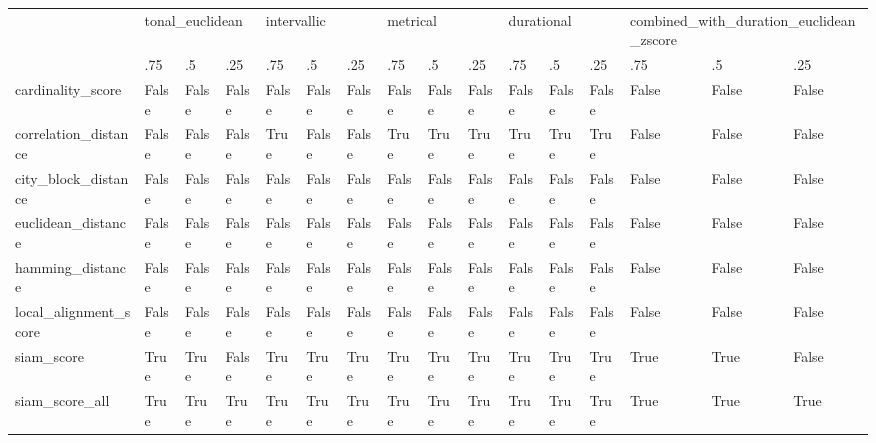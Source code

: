 \begin{tabular}{llllllllllllllll}
\toprule
{} & \multicolumn{3}{l}{tonal\_euclidean} & \multicolumn{3}{l}{intervallic} & \multicolumn{3}{l}{metrical} & \multicolumn{3}{l}{durational} & \multicolumn{3}{l}{combined\_with\_duration\_euclidean\_zscore} \\
{} & .75 & .5 & .25 & .75 & .5 & .25 & .75 & .5 & .25 & .75 & .5 & .25 & .75 & .5 & .25 \\
\midrule
cardinality\_score     & False & False & False & False & False & False & False & False & False & False & False & False & False & False & False \\
correlation\_distance  & False & False & False & True & False & False & True & True & True & True & True & True & False & False & False \\
city\_block\_distance   & False & False & False & False & False & False & False & False & False & False & False & False & False & False & False \\
euclidean\_distance    & False & False & False & False & False & False & False & False & False & False & False & False & False & False & False \\
hamming\_distance      & False & False & False & False & False & False & False & False & False & False & False & False & False & False & False \\
local\_alignment\_score & False & False & False & False & False & False & False & False & False & False & False & False & False & False & False \\
siam\_score            & True & True & False & True & True & True & True & True & True & True & True & True & True & True & False \\
siam\_score\_all        & True & True & True & True & True & True & True & True & True & True & True & True & True & True & True \\
\bottomrule
\end{tabular}


